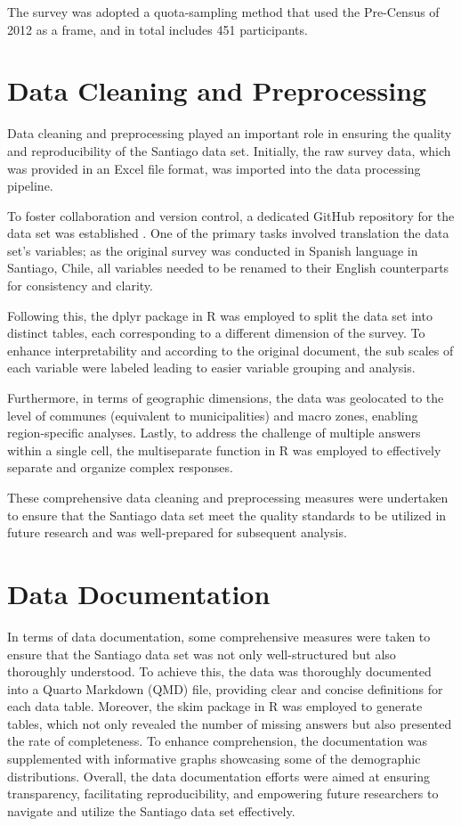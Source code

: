 \documentclass[
11pt, %
oneside, %
english, %
singlespacing, %
]{macthesis} %
\begin{document}
The survey was adopted a quota-sampling method that used the Pre-Census of 2012 as a frame, and in total includes 451 participants.

\hypertarget{data-cleaning-and-preprocessing}{%
\section{Data Cleaning and Preprocessing}\label{data-cleaning-and-preprocessing}}

Data cleaning and preprocessing played an important role in ensuring the quality and reproducibility of the Santiago data set. Initially, the raw survey data, which was provided in an Excel file format, was imported into the data processing pipeline.

To foster collaboration and version control, a dedicated GitHub repository for the data set was established . One of the primary tasks involved translation the data set's variables; as the original survey was conducted in Spanish language in Santiago, Chile, all variables needed to be renamed to their English counterparts for consistency and clarity.

Following this, the dplyr package in R was employed to split the data set into distinct tables, each corresponding to a different dimension of the survey. To enhance interpretability and according to the original document, the sub scales of each variable were labeled leading to easier variable grouping and analysis.

Furthermore, in terms of geographic dimensions, the data was geolocated to the level of communes (equivalent to municipalities) and macro zones, enabling region-specific analyses. Lastly, to address the challenge of multiple answers within a single cell, the multiseparate function in R was employed to effectively separate and organize complex responses.

These comprehensive data cleaning and preprocessing measures were undertaken to ensure that the Santiago data set meet the quality standards to be utilized in future research and was well-prepared for subsequent analysis.

\hypertarget{data-documentation}{%
\section{Data Documentation}\label{data-documentation}}

In terms of data documentation, some comprehensive measures were taken to ensure that the Santiago data set was not only well-structured but also thoroughly understood. To achieve this, the data was thoroughly documented into a Quarto Markdown (QMD) file, providing clear and concise definitions for each data table. Moreover, the skim package in R was employed to generate tables, which not only revealed the number of missing answers but also presented the rate of completeness. To enhance comprehension, the documentation was supplemented with informative graphs showcasing some of the demographic distributions. Overall, the data documentation efforts were aimed at ensuring transparency, facilitating reproducibility, and empowering future researchers to navigate and utilize the Santiago data set effectively.
\end{document}
